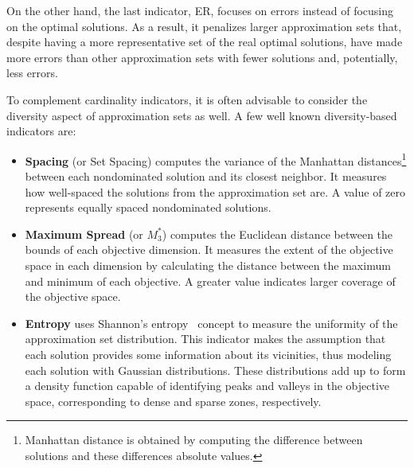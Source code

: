 	On the other hand, the last indicator, \ac{ER}, focuses on errors instead of focusing on the optimal solutions. As a result, it penalizes larger approximation sets that, despite having a more representative set of the real optimal solutions, have made more errors than other approximation sets with fewer solutions and, potentially, less errors. 
	
	To complement cardinality indicators, it is often advisable to consider the diversity aspect of approximation sets as well. A few well known diversity-based indicators are:
	\begin{itemize}
		\item \textbf{Spacing} (or Set Spacing) computes the variance of the Manhattan distances\footnote{Manhattan distance is obtained by computing the difference between solutions and these differences absolute values.} between each nondominated solution and its closest neighbor. It measures how well-spaced the solutions from the approximation set are. A value of zero represents equally spaced nondominated solutions. 
		\item \textbf{Maximum Spread} (or \textbf{$M_3^\ast$}) computes the Euclidean distance between the bounds of each objective dimension. It measures the extent of the objective space in each dimension by calculating the distance between the maximum and minimum of each objective. A greater value indicates larger coverage of the objective space.
		
		\item \textbf{Entropy} uses Shannon's entropy~\cite{Shannon1948} concept to measure the uniformity of the approximation set distribution. This indicator makes the assumption that each solution provides some information about its vicinities, thus modeling each solution with Gaussian distributions. These distributions add up to form a density function capable of identifying peaks and valleys in the objective space, corresponding to dense and sparse zones, respectively. 
		

\end{itemize}
